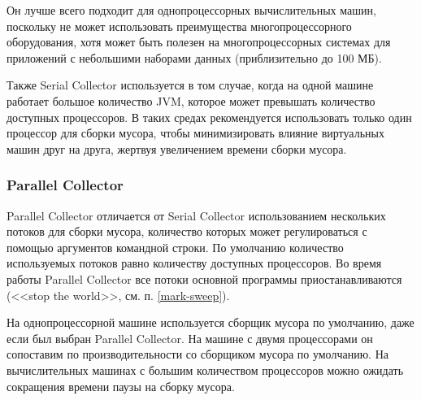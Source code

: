 Он лучше всего подходит для однопроцессорных вычислительных машин, поскольку не может использовать преимущества многопроцессорного оборудования, хотя может быть полезен на многопроцессорных системах для приложений с небольшими наборами данных (приблизительно до 100 МБ). \cite{java_21_available_collectors}

Также Serial Collector используется в том случае, когда на одной машине работает большое количество JVM, которое может превышать количество доступных процессоров. В таких средах рекомендуется использовать только один процессор для сборки мусора, чтобы минимизировать влияние виртуальных машин друг на друга, жертвуя увеличением времени сборки мусора. \cite{java_gc_basics}



\subsubsection{Parallel Collector}

Parallel Collector отличается от Serial Collector использованием нескольких потоков для сборки мусора, количество которых может регулироваться с помощью аргументов командной строки. \cite{java_21_available_collectors} По умолчанию количество используемых потоков равно количеству доступных процессоров. \cite{java_gc_basics}
Во время работы Parallel Collector все потоки основной программы приостанавливаются (<<stop the world>>, см. п. \ref{mark-sweep}). \cite{java_jrockit_memory}

На однопроцессорной машине используется сборщик мусора по умолчанию, даже если был выбран Parallel Collector. На машине с двумя процессорами он сопоставим по производительности со сборщиком мусора по умолчанию. На вычислительных машинах с большим количеством процессоров можно ожидать сокращения времени паузы на сборку мусора. \cite{java_gc_basics}

